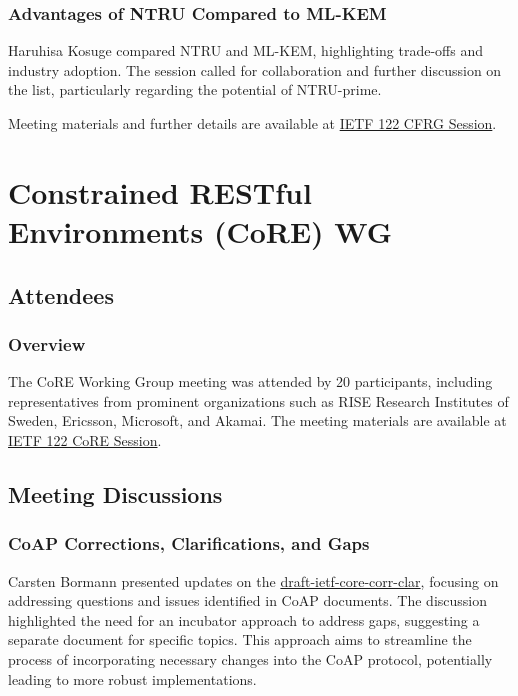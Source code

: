 \documentclass{article}
\begin{document}
\subsubsection{Advantages of NTRU Compared to ML-KEM}

Haruhisa Kosuge compared NTRU and ML-KEM, highlighting trade-offs and industry adoption. The session called for collaboration and further discussion on the list, particularly regarding the potential of NTRU-prime.

Meeting materials and further details are available at \href{https://meetings.conf.meetecho.com/ietf122/?session=33810}{IETF 122 CFRG Session}.



\newpage

\section{Constrained RESTful Environments (CoRE) WG}

\subsection{Attendees}

\subsubsection{Overview}
The CoRE Working Group meeting was attended by 20 participants, including representatives from prominent organizations such as RISE Research Institutes of Sweden, Ericsson, Microsoft, and Akamai. The meeting materials are available at \href{https://datatracker.ietf.org/meeting/122/session/core}{IETF 122 CoRE Session}.

\subsection{Meeting Discussions}

\subsubsection{CoAP Corrections, Clarifications, and Gaps}
Carsten Bormann presented updates on the \href{https://datatracker.ietf.org/doc/draft-ietf-core-corr-clar/}{draft-ietf-core-corr-clar}, focusing on addressing questions and issues identified in CoAP documents. The discussion highlighted the need for an incubator approach to address gaps, suggesting a separate document for specific topics. This approach aims to streamline the process of incorporating necessary changes into the CoAP protocol, potentially leading to more robust implementations.
\end{document}
